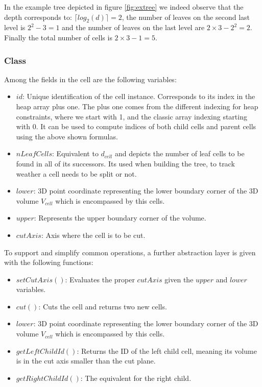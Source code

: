 \documentclass[]{article}
\begin{document}
In the example tree depicted in figure \ref{fig:extree} we indeed observe that the depth corresponds to: $\lceil log_2(d) \rceil = 2$, the number of leaves on the second last level is  $2^{2} - 3 = 1$ and the number of leaves on the last level are $2 \times 3 - 2^{2} = 2$. Finally the total number of cells is $2\times 3 - 1 = 5$.

\subsubsection{Class}
Among the fields in the cell are the following variables:

\begin{itemize}
	\item $id$: Unique identification of the cell instance. Corresponds to its index in the heap array plus one. The plus one comes from the different indexing for heap constraints, where we start with 1, and the classic array indexing starting with 0. It can be used to compute  indices of both child cells and parent cells using the above shown formulas.
	\item $nLeafCells$: Equivalent to  $d_{cell}$ and depicts the number of leaf cells to be found in all of its successors. Its used when building the tree, to track weather a cell needs to be split or not. 
	\item $lower$: 3D point coordinate representing the lower boundary corner of the 3D volume $V_{cell}$ which is encompassed by this cells.
	\item $upper$: Represents the upper boundary corner of the volume.	
	\item $cutAxis$: Axis where the cell is to be cut. 
\end{itemize}

To support and simplify common operations, a further abstraction layer is given with the following functions:


\begin{itemize}
	\item $setCutAxis()$: Evaluates the proper $cutAxis$ given the $upper$ and $lower$ variables.
	\item $cut()$: Cuts the cell and returns two new cells. 
	\item $lower$: 3D point coordinate representing the lower boundary corner of the 3D volume $V_{cell}$ which is encompassed by this cells.
	\item $getLeftChildId()$: Returns the ID of the left child cell, meaning its volume is in the cut axis smaller than the cut plane. 
	\item $getRightChildId()$: The equivalent for the right child. 
\end{itemize} 
\end{document}
